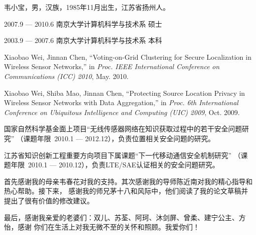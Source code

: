 \documentclass[oneside, phd]{njuthesis}
\begin{document}

\begin{resume}
\begin{authorinfo}
\noindent 韦小宝，男，汉族，1985年11月出生，江苏省扬州人。
\end{authorinfo}
\begin{education}
\item[2007.9 --- 2010.6] 南京大学计算机科学与技术系 \hfill 硕士
\item[2003.9 --- 2007.6] 南京大学计算机科学与技术系 \hfill 本科
\end{education}
\begin{publications}
\item Xiaobao Wei, Jinnan Chen, ``Voting-on-Grid Clustering for Secure
  Localization in Wireless Sensor Networks,'' in \emph{Proc. IEEE International
    Conference on Communications (ICC) 2010}, May. 2010.
\item Xiaobao Wei, Shiba Mao, Jinnan Chen, ``Protecting Source Location Privacy
  in Wireless Sensor Networks with Data Aggregation,'' in \emph{Proc. 6th
    International Conference on Ubiquitous Intelligence and Computing (UIC)
    2009}, Oct. 2009.
\end{publications}
\begin{projects}
\item 国家自然科学基金面上项目``无线传感器网络在知识获取过程中的若干安全问题研究''
（课题年限~2010.1 --- 2012.12），负责位置相关安全问题的研究。
\item 江苏省知识创新工程重要方向项目下属课题``下一代移动通信安全机制研究''
（课题年限~2010.1 --- 2010.12），负责LTE/SAE认证相关的安全问题研究。
\end{projects}
\end{resume}


\begin{acknowledgement}
  首先感谢我的母亲韦春花对我的支持。其次感谢我的导师陈近南对我的精心指导和热心帮助。接下来，
  感谢我的师兄茅十八和风际中，他们阅读了我的论文草稿并提出了很有价值的修改建议。

  最后，感谢我亲爱的老婆们：双儿、苏荃、阿珂、沐剑屏、曾柔、建宁公主、方怡，感谢
  你们在生活上对我无微不至的关怀和照顾。我爱你们！
\end{acknowledgement}

\end{document}
